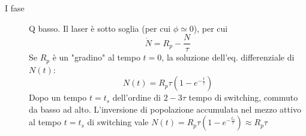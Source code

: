 \documentclass{book}
\theoremstyle{remark}
\begin{document}
\begin{description}
\item [I fase] Q basso.
Il laser è sotto soglia (per cui $\phi \simeq 0$), per cui
\begin{equation*}
\dot{N} = R_p -\frac{N}{\tau}
\end{equation*}
Se $R_p$ è un "gradino" al tempo $t=0$, la soluzione dell'eq. differenziale di $N(t)$:
\begin{equation*}
N(t) = R_p\tau\left(1 - e^{-\frac{t}{\tau}}\right)
\end{equation*}
Dopo un tempo $t=t_s$ dell'ordine di $2-3 \tau$ tempo di switching, commuto da basso ad alto. L'inversione di popolazione accumulata nel mezzo attivo al tempo $t=t_s$ di switching vale $N(t) = R_p\tau\left(1 - e^{-\frac{t_s}{\tau}}\right) \approx R_p\tau$\\


\end{description}
\end{document}
